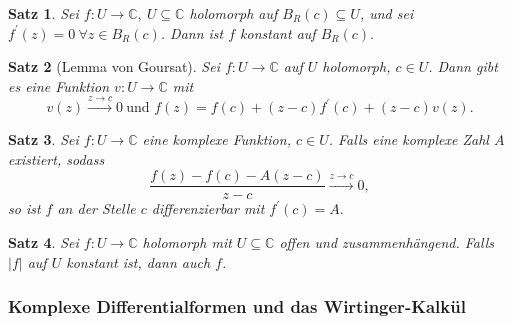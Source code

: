\documentclass[a4paper,12pt]{article}
\theoremstyle{newthm}
\newtheorem{thm}{Satz}[subsection]
\theoremstyle{newdef}
\theoremstyle{newrem}
\newcommand{\C}{\mathbb{C}}
\begin{document}
		\begin{thm}
			Sei $ f: U \to \C,\ U \subseteq \C $ holomorph auf $ B_R(c) \subseteq U $, und sei $ f^\prime(z) = 0\ \forall z \in B_R(c) $. Dann ist $f$ konstant auf $ B_R(c). $
		\end{thm}
		
		\begin{thm}[Lemma von Goursat]
			Sei $ f: U \to \C $ auf $U$ holomorph, $ c \in U $. Dann gibt es eine Funktion $ v: U \to \C $ mit 
			$$ v(z) \overset{z \to c}{\longrightarrow} 0\ \text{und } f(z) = f(c) + (z-c)f^\prime(c) + (z-c) v(z). $$
		\end{thm}
		
		\begin{thm}
			Sei $ f: U \to \C $ eine komplexe Funktion, $ c \in U $. Falls eine komplexe Zahl $A$ existiert, sodass 
			\[ \frac{f(z) - f(c) - A(z-c)}{z-c} \overset{z \to c}{\longrightarrow} 0, \]
			so ist $f$ an der Stelle $c$ differenzierbar mit $ f^\prime(c) = A. $
		\end{thm}
		
		\begin{thm}
			Sei $ f: U \to \C $ holomorph mit $ U \subseteq \C $ offen und zusammenhängend. Falls $ |f| $ auf $U$ konstant ist, dann auch $f$.
		\end{thm}
	
	
	
	\subsubsection*{Komplexe Differentialformen und das Wirtinger-Kalkül}
		
\end{document}
